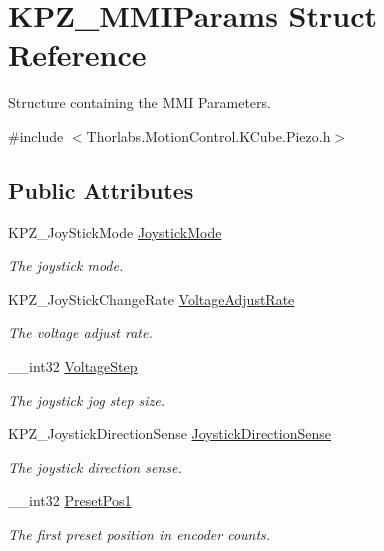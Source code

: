 \hypertarget{struct_k_p_z___m_m_i_params}{}\section{K\+P\+Z\+\_\+\+M\+M\+I\+Params Struct Reference}
\label{struct_k_p_z___m_m_i_params}


Structure containing the M\+MI Parameters.  




{\ttfamily \#include $<$Thorlabs.\+Motion\+Control.\+K\+Cube.\+Piezo.\+h$>$}

\subsection*{Public Attributes}
\begin{DoxyCompactItemize}
\item 
K\+P\+Z\+\_\+\+Joy\+Stick\+Mode \hyperlink{struct_k_p_z___m_m_i_params_a985db5a3f457d8583670660ce8d25cd8}{Joystick\+Mode}
\begin{DoxyCompactList}\small\item\em The joystick mode. \end{DoxyCompactList}\item 
K\+P\+Z\+\_\+\+Joy\+Stick\+Change\+Rate \hyperlink{struct_k_p_z___m_m_i_params_ad71328a3ce42e7fbba846710e3c213b1}{Voltage\+Adjust\+Rate}
\begin{DoxyCompactList}\small\item\em The voltage adjust rate. \end{DoxyCompactList}\item 
\+\_\+\+\_\+int32 \hyperlink{struct_k_p_z___m_m_i_params_aa7df8e0a98f26207721696a3a8dc3524}{Voltage\+Step}
\begin{DoxyCompactList}\small\item\em The joystick jog step size. \end{DoxyCompactList}\item 
K\+P\+Z\+\_\+\+Joystick\+Direction\+Sense \hyperlink{struct_k_p_z___m_m_i_params_a486d44e6de44a642cf8a7a8982421835}{Joystick\+Direction\+Sense}
\begin{DoxyCompactList}\small\item\em The joystick direction sense. \end{DoxyCompactList}\item 
\+\_\+\+\_\+int32 \hyperlink{struct_k_p_z___m_m_i_params_a15fbb7a3f8ffe52584a1b485cc9859c0}{Preset\+Pos1}
\begin{DoxyCompactList}\small\item\em The first preset position in encoder counts. \end{DoxyCompactList}\item 

\end{DoxyCompactItemize}
